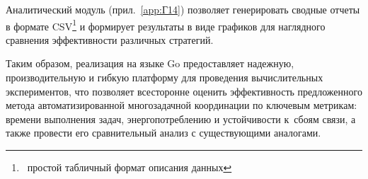 
Аналитический модуль (прил.~\ref{app:Г14}) позволяет генерировать сводные отчеты в формате CSV\footnote{\  простой табличный формат описания данных} и формирует результаты в виде графиков для наглядного сравнения эффективности различных стратегий.


Таким образом, реализация на языке Go предоставляет надежную, производительную и гибкую платформу для проведения вычислительных экспериментов, что позволяет всесторонне оценить эффективность предложенного метода автоматизированной многозадачной координации по ключевым метрикам: времени выполнения задач, энергопотреблению и устойчивости к~сбоям связи, а также провести его сравнительный анализ с существующими аналогами.

\appendix



